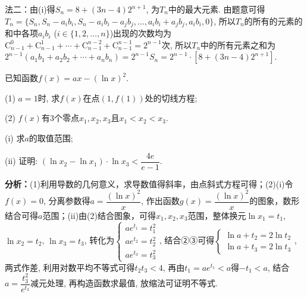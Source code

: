 \begin{question}[points=15]
\begin{solution}
法二：由(i)得$S_n = 8 + (3n-4)2^{n+1}$, 为$T_n$中的最大元素. 由题意可得$T_n = \{S_n, S_n - a_i b_i, S_n - a_i b_i - a_j b_j, \ldots, a_i b_i + a_j b_j, a_i b_i, 0\}$, 所以$T_n$的所有的元素的和中各项$a_i b_i$ ($i \in \{1,2,\ldots,n\}$)出现的次数均为$\mathrm{C}_{n-1}^0 + \mathrm{C}_{n-1}^1 + \cdots + \mathrm{C}_{n-1}^{n-2} + \mathrm{C}_{n-1}^{n-1} = 2^{n-1}$次, 所以$T_n$中的所有元素之和为$2^{n-1} (a_1 b_1 + a_2 b_2 + \cdots + a_n b_n) = 2^{n-1} S_n = 2^{n-1} \cdot [8 + (3n-4)2^{n+1}]$.
\end{solution}
\end{question}

\begin{question}[points=15]
已知函数$f(x) = ax - (\ln x)^2$.

(1) $a = 1$时, 求$f(x)$在点$(1, f(1))$处的切线方程;

(2) $f(x)$有3个零点$x_1, x_2, x_3$且$x_1 < x_2 < x_3$.

(i) 求$a$的取值范围;

(ii) 证明: $(\ln x_2 - \ln x_1) \cdot \ln x_3 < \dfrac{4e}{e-1}$.
\begin{solution}

\textbf{分析：}(1)利用导数的几何意义，求导数值得斜率，由点斜式方程可得；(2)(i)令$f(x)=0$, 分离参数得$a = \dfrac{(\ln x)^2}{x}$, 作出函数$g(x) = \dfrac{(\ln x)^2}{x}$的图象，数形结合可得$a$范围；(ii)由(2)结合图象，可得$x_1, x_2, x_3$范围，整体换元$\ln x_1 = t_1$, $\ln x_2 = t_2$, $\ln x_3 = t_3$, 转化为$\begin{cases} ae^{t_1} = t_1^2 \\ ae^{t_2} = t_2^2 \\ ae^{t_3} = t_3^2 \end{cases}$, 结合②③可得$\begin{cases} \ln a + t_2 = 2\ln t_2 \\ \ln a + t_3 = 2\ln t_3 \end{cases}$, 两式作差, 利用对数平均不等式可得$t_2 t_3 < 4$, 再由$t_1 = ae^{t_1} < a$得$-t_1 < a$, 结合$a = \dfrac{t_3^2}{e^{t_3}}$减元处理, 再构造函数求最值, 放缩法可证明不等式.


\end{solution}
\end{question}
